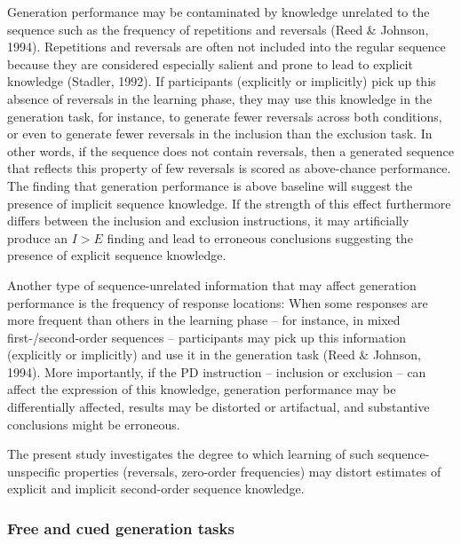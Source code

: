 \documentclass[
  english,
  man]{apa6}
\begin{document}
Generation performance may be contaminated by knowledge unrelated to the sequence such as the frequency of repetitions and reversals (Reed \& Johnson, 1994).
Repetitions and reversals are often not included into the regular sequence because they are considered especially salient and prone to lead to explicit knowledge (Stadler, 1992).
If participants (explicitly or implicitly) pick up this absence of reversals in the learning phase, they may use this knowledge in the generation task, for instance, to generate fewer reversals across both conditions, or even to generate fewer reversals in the inclusion than the exclusion task.
In other words, if the sequence does not contain reversals, then a generated sequence that reflects this property of few reversals is scored as above-chance performance.
The finding that generation performance is above baseline will suggest the presence of implicit sequence knowledge.
If the strength of this effect furthermore differs between the inclusion and exclusion instructions, it may artificially produce an \(I>E\) finding and lead to erroneous conclusions suggesting the presence of explicit sequence knowledge.

Another type of sequence-unrelated information that may affect generation performance is the frequency of response locations:
When some responses are more frequent than others in the learning phase -- for instance, in mixed first-/second-order sequences -- participants may pick up this information (explicitly or implicitly) and use it in the generation task (Reed \& Johnson, 1994).
More importantly, if the PD instruction -- inclusion or exclusion -- can affect the expression of this knowledge, generation performance may be differentially affected, results may be distorted or artifactual, and substantive conclusions might be erroneous.

The present study investigates the degree to which learning of such sequence-unspecific properties (reversals, zero-order frequencies) may distort estimates of explicit and implicit second-order sequence knowledge.

\hypertarget{free-and-cued-generation-tasks}{%
\subsubsection{Free and cued generation tasks}\label{free-and-cued-generation-tasks}}
\end{document}
